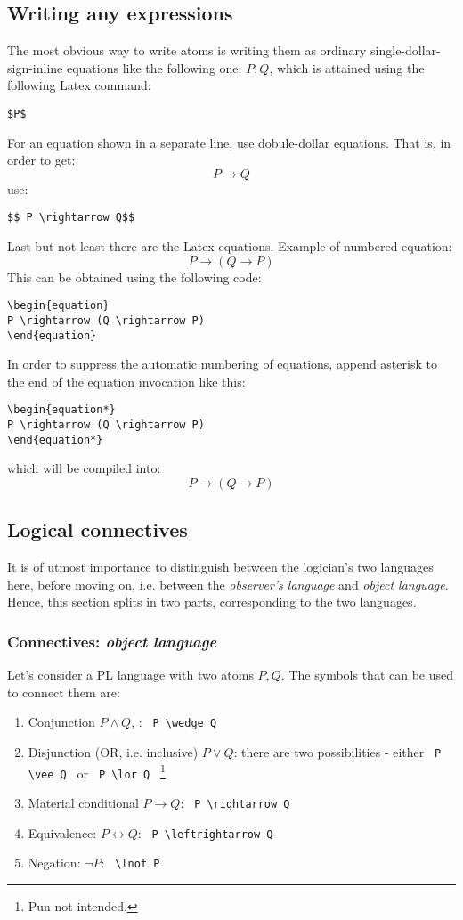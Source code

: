 \documentclass[12pt]{article}
\begin{document}
\subsection{Writing any expressions}
The most obvious way to write atoms is writing them as ordinary single-dollar-sign-inline equations like the following one: $P, Q$, which is attained using the following Latex command:
\begin{verbatim}
$P$
\end{verbatim}
For an equation shown in a separate line, use dobule-dollar equations. That is, in order to get:
$$ P \rightarrow Q$$
use: 
\begin{verbatim}
$$ P \rightarrow Q$$
\end{verbatim}
Last but not least there are the Latex equations. Example of numbered equation:
\begin{equation}
P \rightarrow (Q \rightarrow P)
\end{equation}
This can be obtained using the following code:
\begin{verbatim}
\begin{equation}
P \rightarrow (Q \rightarrow P)
\end{equation}
\end{verbatim}
In order to suppress the automatic numbering of equations, append asterisk to the end of the equation invocation like this:
\begin{verbatim}
\begin{equation*}
P \rightarrow (Q \rightarrow P)
\end{equation*}
\end{verbatim}
which will be compiled into: 
\begin{equation*}
P \rightarrow (Q \rightarrow P)
\end{equation*}

\subsection{Logical connectives}
It is of utmost importance to distinguish between the logician's two languages here, before moving on, i.e. between the \textit{observer's language} and \textit{object language}. Hence, this section splits in two parts, corresponding to the two languages.
\subsubsection{Connectives: \textit{object language}}
Let's consider a PL language with two atoms $P, Q$. The symbols that can be used to connect them are:
\begin{enumerate}
\item Conjunction $ P \wedge Q $, : \verb+ P \wedge Q +
\item Disjunction (OR, i.e. inclusive) $P \vee Q$: there are two possibilities - either 
\verb+ P \vee Q + or \verb+ P \lor Q + \footnote{Pun not intended.}
\item Material conditional $ P \rightarrow Q $: \verb+ P \rightarrow Q +
\item Equivalence: $ P \leftrightarrow Q$: \verb+ P \leftrightarrow Q +
\item Negation: $ \lnot P $: \verb+ \lnot P +
\end{enumerate}
\end{document}
